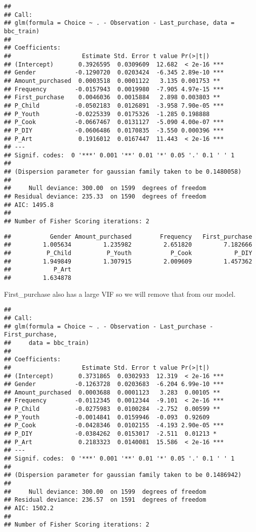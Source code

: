\documentclass[
]{article}
\begin{document}
\begin{verbatim}
## 
## Call:
## glm(formula = Choice ~ . - Observation - Last_purchase, data = bbc_train)
## 
## Coefficients:
##                    Estimate Std. Error t value Pr(>|t|)    
## (Intercept)       0.3926595  0.0309609  12.682  < 2e-16 ***
## Gender           -0.1290720  0.0203424  -6.345 2.89e-10 ***
## Amount_purchased  0.0003518  0.0001122   3.135 0.001753 ** 
## Frequency        -0.0157943  0.0019980  -7.905 4.97e-15 ***
## First_purchase    0.0046036  0.0015884   2.898 0.003803 ** 
## P_Child          -0.0502183  0.0126891  -3.958 7.90e-05 ***
## P_Youth          -0.0225339  0.0175326  -1.285 0.198888    
## P_Cook           -0.0667467  0.0131127  -5.090 4.00e-07 ***
## P_DIY            -0.0606486  0.0170835  -3.550 0.000396 ***
## P_Art             0.1916012  0.0167447  11.443  < 2e-16 ***
## ---
## Signif. codes:  0 '***' 0.001 '**' 0.01 '*' 0.05 '.' 0.1 ' ' 1
## 
## (Dispersion parameter for gaussian family taken to be 0.1480058)
## 
##     Null deviance: 300.00  on 1599  degrees of freedom
## Residual deviance: 235.33  on 1590  degrees of freedom
## AIC: 1495.8
## 
## Number of Fisher Scoring iterations: 2
\end{verbatim}

\begin{verbatim}
##           Gender Amount_purchased        Frequency   First_purchase 
##         1.005634         1.235982         2.651820         7.182666 
##          P_Child          P_Youth           P_Cook            P_DIY 
##         1.949849         1.307915         2.009609         1.457362 
##            P_Art 
##         1.634878
\end{verbatim}

First\_purchase also has a large VIF so we will remove that from our
model.

\begin{verbatim}
## 
## Call:
## glm(formula = Choice ~ . - Observation - Last_purchase - First_purchase, 
##     data = bbc_train)
## 
## Coefficients:
##                    Estimate Std. Error t value Pr(>|t|)    
## (Intercept)       0.3731865  0.0302933  12.319  < 2e-16 ***
## Gender           -0.1263728  0.0203683  -6.204 6.99e-10 ***
## Amount_purchased  0.0003688  0.0001123   3.283  0.00105 ** 
## Frequency        -0.0112345  0.0012344  -9.101  < 2e-16 ***
## P_Child          -0.0275983  0.0100284  -2.752  0.00599 ** 
## P_Youth          -0.0014841  0.0159946  -0.093  0.92609    
## P_Cook           -0.0428346  0.0102155  -4.193 2.90e-05 ***
## P_DIY            -0.0384262  0.0153017  -2.511  0.01213 *  
## P_Art             0.2183323  0.0140081  15.586  < 2e-16 ***
## ---
## Signif. codes:  0 '***' 0.001 '**' 0.01 '*' 0.05 '.' 0.1 ' ' 1
## 
## (Dispersion parameter for gaussian family taken to be 0.1486942)
## 
##     Null deviance: 300.00  on 1599  degrees of freedom
## Residual deviance: 236.57  on 1591  degrees of freedom
## AIC: 1502.2
## 
## Number of Fisher Scoring iterations: 2
\end{verbatim}
\end{document}
